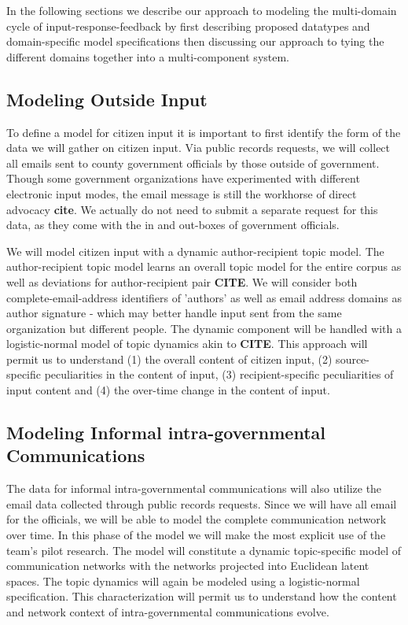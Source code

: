 In the following sections we describe our approach to modeling the multi-domain cycle of input-response-feedback by first describing proposed datatypes and domain-specific model specifications then discussing our approach to tying the different domains together into a multi-component system.

\subsection{Modeling Outside Input}

To define a model for citizen input it is important to first identify the form of the data we will gather on citizen input. Via public records requests, we will collect all emails sent to county government officials by those outside of government. Though some government organizations have experimented with different electronic input modes, the email message is still the workhorse of direct advocacy {\bf cite}. We actually do not need to submit a separate request for this data, as they come with the in and out-boxes of government officials. 

We will model citizen input with a dynamic author-recipient topic model. The author-recipient topic model learns an overall topic model for the entire corpus as well as deviations for author-recipient pair {\bf CITE}. We will consider both complete-email-address identifiers of 'authors' as well as email address domains as author signature - which may better handle input sent from the same organization but different people. The dynamic component will be handled with a logistic-normal model of topic dynamics akin to {\bf CITE}. This approach will permit us to understand (1) the overall content of citizen input, (2) source-specific peculiarities in the content of input, (3) recipient-specific peculiarities of input content and (4) the over-time change in the content of input.

\subsection{Modeling Informal intra-governmental Communications}

The data for informal intra-governmental communications will also utilize the email data collected through public records requests. Since we will have all email for the officials, we will be able to model the complete communication network over time. In this phase of the model we will make the most explicit use of the team's pilot research. The model will constitute a dynamic topic-specific model of communication networks with the networks projected into Euclidean latent spaces. The topic dynamics will again be modeled using a logistic-normal specification. This characterization will permit us to understand how the content and network context of intra-governmental communications evolve.



